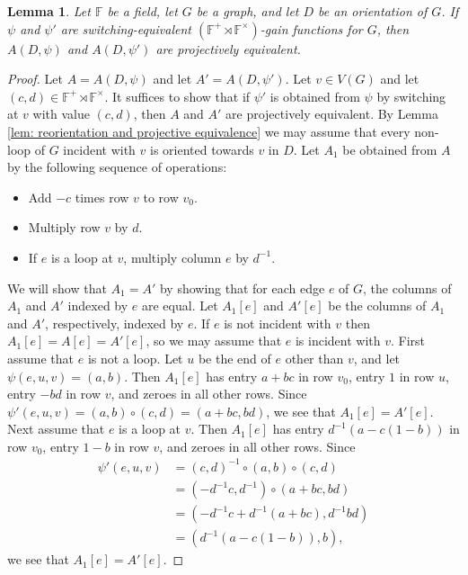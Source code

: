\documentclass[12pt]{article}
\newtheorem{lemma}[theorem]{Lemma}
\theoremstyle{definition}
\newcommand{\bF}{\mathbb F}
\begin{document}
\begin{lemma} \label{lem: switching and projective equivalence}
Let $\bF$ be a field, let $G$ be a graph, and let $D$ be an orientation of $G$.
If $\psi$ and $\psi'$ are switching-equivalent $(\bF^{+} \rtimes \bF^{\times})$-gain functions for $G$, then $A(D, \psi)$ and $A(D, \psi')$ are projectively equivalent.
\end{lemma}
\begin{proof}
Let $A = A(D, \psi)$ and let $A' = A(D, \psi')$.
Let $v \in V(G)$ and let $(c, d) \in \bF^+ \rtimes \bF^{\times}$.
It suffices to show that if $\psi'$ is obtained from $\psi$ by switching at $v$ with value $(c,d)$, then $A$ and $A'$ are projectively equivalent.
By Lemma \ref{lem: reorientation and projective equivalence} we may assume that every non-loop of $G$ incident with $v$ is oriented towards $v$ in $D$.
Let $A_1$ be obtained from $A$ by the following sequence of operations:
\begin{itemize}
    \item Add $-c$ times row $v$ to row $v_0$.
    \item Multiply row $v$ by $d$.
    \item If $e$ is a loop at $v$, multiply column $e$ by $d^{-1}$.
\end{itemize}
We will show that $A_1 = A'$ by showing that for each edge $e$ of $G$, the columns of $A_1$ and $A'$ indexed by $e$ are equal.
Let $A_1[e]$ and $A'[e]$ be the columns of $A_1$ and $A'$, respectively, indexed by $e$.
If $e$ is not incident with $v$ then $A_1[e] = A[e] = A'[e]$, so we may assume that $e$ is incident with $v$.
First assume that $e$ is not a loop.
Let $u$ be the end of $e$ other than $v$, and let $\psi(e, u, v) = (a, b)$.
Then $A_1[e]$ has entry $a + bc$ in row $v_0$, entry $1$ in row $u$, entry $-bd$ in row $v$, and zeroes in all other rows.
Since $\psi'(e, u, v) = (a, b) \circ (c, d) = (a + bc, bd)$, we see that $A_1[e] = A'[e]$.
Next assume that $e$ is a loop at $v$.
Then $A_1[e]$ has entry $d^{-1}(a - c(1 - b))$ in row $v_0$, entry $1 - b$ in row $v$, and zeroes in all other rows.
Since 
\begin{align*}
\psi'(e, u, v) &= (c, d)^{-1} \circ (a, b) \circ (c, d) \\
&= (-d^{-1}c, d^{-1}) \circ (a + bc, bd) \\
& = (-d^{-1}c + d^{-1}(a + bc), d^{-1}bd) \\
&= (d^{-1}(a - c(1 - b)), b),
\end{align*}
we see that $A_1[e] = A'[e]$.
\end{proof}
\end{document}
